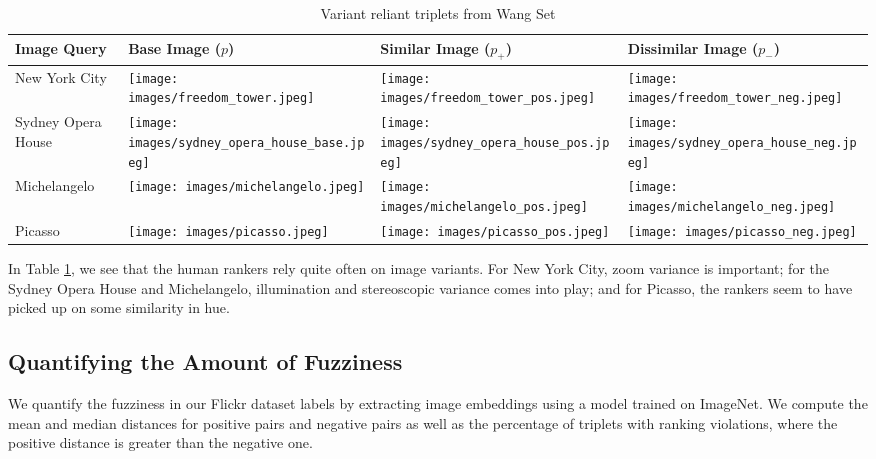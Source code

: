 \begin{table}
	\begin{tabular}{>{\centering\arraybackslash}m{1in} >{\centering\arraybackslash}m{1.4in} >{\centering\arraybackslash}m{1.4in} >{\centering\arraybackslash}m{1.4in}}
		\toprule
		\bfseries Image Query & \bfseries Base Image ($p$) & \bfseries Similar Image ($p_+$) & \bfseries Dissimilar Image ($p_-$) \\
		\midrule
		\centering New York City & \texttt{[image: images/freedom\_tower.jpeg]} & \texttt{[image: images/freedom\_tower\_pos.jpeg]} & \texttt{[image: images/freedom\_tower\_neg.jpeg]}\\
		Sydney Opera House & \texttt{[image: images/sydney\_opera\_house\_base.jpeg]} & \texttt{[image: images/sydney\_opera\_house\_pos.jpeg]} & \texttt{[image: images/sydney\_opera\_house\_neg.jpeg]}\\
		Michelangelo & \texttt{[image: images/michelangelo.jpeg]} & \texttt{[image: images/michelangelo\_pos.jpeg]} & \texttt{[image: images/michelangelo\_neg.jpeg]}\\
		Picasso & \texttt{[image: images/picasso.jpeg]} & \texttt{[image: images/picasso\_pos.jpeg]} & \texttt{[image: images/picasso\_neg.jpeg]}\\
		\bottomrule
	\end{tabular}
	\caption{Variant reliant triplets from Wang Set}
	\label{table:variant_triplets}
\end{table}

In Table \ref{table:variant_triplets}, we see that the human rankers rely quite often on image variants. For New York City, zoom variance is important; for the Sydney Opera House and Michelangelo, illumination and stereoscopic variance comes into play; and for Picasso, the rankers seem to have picked up on some similarity in hue.




\subsection{Quantifying the Amount of Fuzziness}
We quantify the fuzziness in our Flickr dataset labels by extracting image embeddings using a model trained on ImageNet. We compute the mean and median distances for positive pairs and negative pairs as well as the percentage of triplets with ranking violations, where the positive distance is greater than the negative one.

